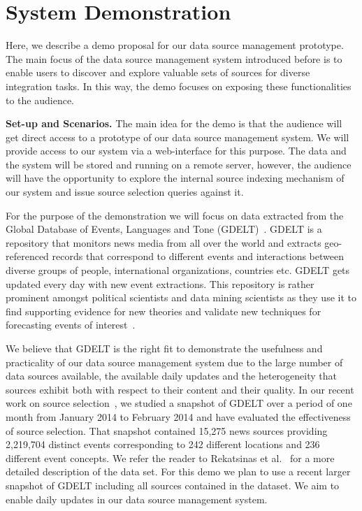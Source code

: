 \documentclass{sig-alternate}
\begin{document}
\section{System Demonstration}
Here, we describe a demo proposal for our data source management prototype. The main focus of the data source management system introduced before is to enable users to discover and explore valuable sets of sources for diverse integration tasks. In this way, the demo focuses on exposing these functionalities to the audience. 

\vspace{3pt}\noindent\textbf{Set-up and Scenarios.} The main idea for the demo is that the audience will get direct access to a prototype of our data source management system. We will provide access to our system via a web-interface for this purpose. The data and the system will be stored and running on a remote server, however, the audience will have the opportunity to explore the internal source indexing mechanism of our system and issue source selection queries against it. 

For the purpose of the demonstration we will focus on data extracted from the Global Database of Events, Languages and Tone (GDELT)~\cite{leetaru:2013}. GDELT is a repository that monitors news media from all over the world and extracts geo-referenced records that correspond to different events and interactions between diverse groups of people, international organizations, countries etc. GDELT gets updated every day with new event extractions. This repository is rather prominent amongst political scientists and data mining scientists as they use it to find supporting evidence for new theories and validate new techniques for forecasting events of interest~\cite{schutte:2014}. 

We believe that GDELT is the right fit to demonstrate the usefulness and practicality of our data source management system due to the large number of data sources available, the available daily updates and the heterogeneity that sources exhibit both with respect to their content and their quality. In our recent work on source selection~\cite{rekatsinas:2014}, we studied a snapshot of GDELT over a period of one month from January 2014 to February 2014 and have evaluated the effectiveness of source selection. That snapshot contained 15,275 news sources providing 2,219,704 distinct events corresponding to 242 different locations and 236 different event concepts. We refer the reader to Rekatsinas et al.~\cite{rekatsinas:2014} for a more detailed description of the data set. For this demo we plan to use a recent larger snapshot of GDELT including all sources contained in the dataset. We aim to enable daily updates in our data source management system.
\end{document}
